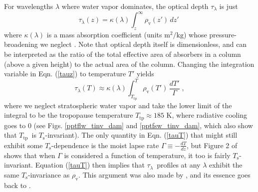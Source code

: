 \documentclass[9pt,twocolumn,twoside,lineno]{pnas-new}
\newcommand{\beqn}{\begin{equation}}
\newcommand{\eeqn}{\end{equation}}
\newcommand{\eqnref}[1]{(\ref{#1})}
\newcommand{\tauk}{\ensuremath{\tau_\lambda}}
\newcommand{\rhov}{\ensuremath{\rho_\mathrm{v}}}
\newcommand{\Ts}{\ensuremath{T_\mathrm{s}}}
\newcommand{\Ttp}{\ensuremath{T_\mathrm{tp}}}
\begin{document}
	 
	For wavelengths  $\lambda$ where water vapor dominates, the optical depth $\tauk$ is just
	\beqn
		\tauk(z) = \kappa(\lambda) \int_z^\infty   \rhov(z') \, dz'  \; 
		\label{tauz}
	\eeqn
		where $\kappa(\lambda)$ is a  mass absorption coefficient  (units $\mathrm{m^2/kg}$) whose pressure-broadening we neglect \citep[as in][see  also section \ref{sec_summary}]{ingram2010}. Note that optical depth itself is dimensionless, and can be interpreted as the ratio of the total effective area of absorbers in a column (above a given height) to the actual area of the column. Changing the integration variable in Eqn. \eqnref{tauz} to temperature $T'$  yields
		\beqn
		\tauk(T) \approx  \kappa(\lambda) \int_{\Ttp}^T   \rhov(T') \, \frac{dT'}{\Gamma}  \; ,
		\label{tauT}
	\eeqn
	where we neglect stratospheric water vapor and take the lower limit of the integral to be the tropopause temperature $\Ttp \approx 185$ K, where radiative cooling goes to 0 (see Figs. \ref{pptflw_tinv_dam} and  \ref{pptfsw_tinv_dam}, which also show that \Ttp\ is \Ts-invariant). The only quantity in Eqn. \eqnref{tauT} that might still exhibit some \Ts-dependence is the  moist lapse rate $\Gamma\equiv -\frac{dT}{dz}$, but Figure 2 of \cite{ingram2010} shows that when $\Gamma$ is considered a function of temperature, it too is fairly  \Ts-invariant. Equation \eqnref{tauT} then implies that \tauk\ profiles at any $\lambda$ exhibit the same \Ts-invariance as \rhov. This argument was also made by \cite{ingram2010}, and its essence goes back to  \cite{simpson1928}.
	
\end{document}
